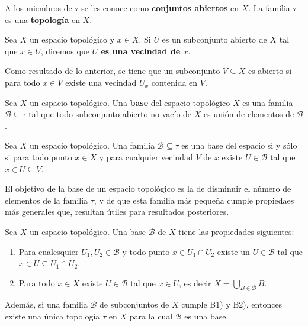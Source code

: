 \documentclass[12pt]{report}
\theoremstyle{largebreak}
\newcommand{\eul}[1]{\ensuremath{\mathscr{#1}}}
\renewcommand{\theenumi}{\arabic{enumi})}
\begin{document}
    A los miembros de $\tau$ se les conoce como \textbf{conjuntos abiertos} en $X$. La familia $\tau$ es una \textbf{topología} en $X$.

    \begin{mydef}
        Sea $X$ un espacio topológico y $x\in X$. Si $U$ es un subconjunto abierto de $X$ tal que $x\in U$, diremos que \textbf{$U$ es una vecindad de $x$}.
    \end{mydef}

    Como resultado de lo anterior, se tiene que un subconjunto $V\subseteq X$ es abierto si para todo $x\in V$ existe una vecindad $U_x$ contenida en $V$.

    \begin{mydef}
        Sea $X$ un espacio topológico. Una \textbf{base} del espacio topológico $X$ es una familia $\eul{B}\subseteq\tau$ tal que todo subconjunto abierto no vacío de $X$ es unión de elementos de $\eul{B}$.
    \end{mydef}

    \begin{propo}
        Sea $X$ un espacio topológico. Una familia $\eul{B}\subseteq\tau$ es una base del espacio si y sólo si para todo punto $x\in X$ y para cualquier vecindad $V$ de $x$ existe $U\in\eul{B}$ tal que $x\in U\subseteq V$.
    \end{propo}

    El objetivo de la base de un espacio topológico es la de disminuir el número de elementos de la familia $\tau$, y de que esta familia más pequeña cumple propiedaes más generales que, resultan útiles para resultados posteriores.

    \begin{propo}
        Sea $X$ un espacio topológico. Una base $\eul{B}$ de $X$ tiene las propiedades siguientes:
        \renewcommand{\theenumi}{B\arabic{enumi})}
        \begin{enumerate}
            \item Para cualesquier $U_1, U_2\in\eul{B}$ y todo punto $x\in U_1\cap U_2$ existe un $U\in\eul{B}$ tal que $x\in U\subseteq U_1\cap U_2$.
            \item Para todo $x\in X$ existe $U\in\eul{B}$ tal que $x\in U$, es decir $X=\bigcup_{B\in\eul{B}}B$.
        \end{enumerate}
        \renewcommand{\theenumi}{\arabic{enumi})}
        Además, si una familia $\eul{B}$ de subconjuntos de $X$ cumple B1) y B2), entonces existe una única topología $\tau$ en $X$ para la cual $\eul{B}$ es una base.
    \end{propo}
\end{document}
